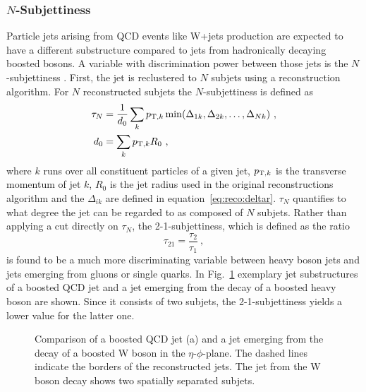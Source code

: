 \subsubsection*{$N$-Subjettiness}
Particle jets arising from QCD events like W+jets production are expected to have a different substructure compared to jets from hadronically decaying boosted bosons. A variable with discrimination power between those jets is the $N$-subjettiness \cite{nsubjettiness}. First, the jet is reclustered to $N$ subjets using a reconstruction algorithm. For $N$ reconstructed subjets the $N$-subjettiness is defined as
\begin{align}
\tau_N &= \frac{1}{d_0} \sum_k p_{{\rm T},k} \min(\Delta_{1k},\Delta_{2k},\dots,\Delta_{Nk}) ~, \\
d_0 &= \sum_k p_{{\rm T},k} R_0 ~,
\end{align}
where $k$ runs over all constituent particles of a given jet, $p_{{\rm T},k}$ is the transverse momentum of jet $k$, $R_0$ is the jet radius used in the original reconstructions algorithm and the $\Delta_{ik}$ are defined in equation~\ref{eq:reco:deltar}. $\tau_N$ quantifies to what degree the jet can be regarded to as composed of $N$ subjets. Rather than applying a cut directly on $\tau_N$, the 2-1-subjettiness, which is defined as the ratio
\begin{equation}
\tau_{21}=\frac{\tau_2}{\tau_1} ~,
\end{equation}
is found to be a much more discriminating variable between heavy boson jets and jets emerging from gluons or single quarks. In Fig.~\ref{fig:reco:nsubjet} exemplary jet substructures of a boosted QCD jet and a jet emerging from the decay of a boosted heavy boson are shown. Since it consists of two subjets, the 2-1-subjettiness yields a lower value for the latter one.
\begin{figure}
    \centering
    \caption[Comparison of a boosted QCD jet and a jet emerging from the decay of a boosted W boson in the $y$-$\phi$-plane]{Comparison of a boosted QCD jet (a) and a jet emerging from the decay of a boosted W boson in the $\eta$-$\phi$-plane. The dashed lines indicate the borders of the reconstructed jets. The jet from the W boson decay shows two spatially separated subjets.}
    \label{fig:reco:nsubjet}
\end{figure}
